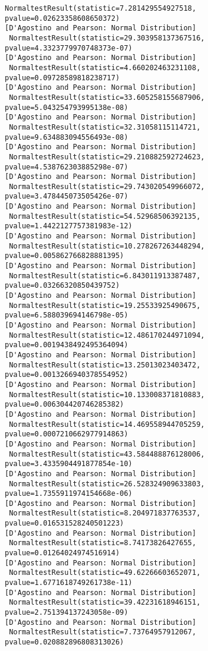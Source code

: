 \documentclass[11pt]{article}
\begin{document}
\begin{Verbatim}[commandchars=\\\{\}]
 NormaltestResult(statistic=7.281429554927518, pvalue=0.02623358608650372)
[D'Agostino and Pearson: Normal Distribution]
 NormaltestResult(statistic=29.303958137367516, pvalue=4.3323779970748373e-07)
[D'Agostino and Pearson: Normal Distribution]
 NormaltestResult(statistic=4.660202463231108, pvalue=0.09728589818238717)
[D'Agostino and Pearson: Normal Distribution]
 NormaltestResult(statistic=33.605258155687906, pvalue=5.043254793995138e-08)
[D'Agostino and Pearson: Normal Distribution]
 NormaltestResult(statistic=32.31058115114721, pvalue=9.634883094556493e-08)
[D'Agostino and Pearson: Normal Distribution]
 NormaltestResult(statistic=29.210882592724623, pvalue=4.538762303885298e-07)
[D'Agostino and Pearson: Normal Distribution]
 NormaltestResult(statistic=29.743020549966072, pvalue=3.478445073505426e-07)
[D'Agostino and Pearson: Normal Distribution]
 NormaltestResult(statistic=54.52968506392135, pvalue=1.4422127757381983e-12)
[D'Agostino and Pearson: Normal Distribution]
 NormaltestResult(statistic=10.278267263448294, pvalue=0.005862766828881395)
[D'Agostino and Pearson: Normal Distribution]
 NormaltestResult(statistic=6.843011913387487, pvalue=0.03266320850439752)
[D'Agostino and Pearson: Normal Distribution]
 NormaltestResult(statistic=19.25533925490675, pvalue=6.588039694146798e-05)
[D'Agostino and Pearson: Normal Distribution]
 NormaltestResult(statistic=12.486170244971094, pvalue=0.0019438492495364094)
[D'Agostino and Pearson: Normal Distribution]
 NormaltestResult(statistic=13.25013023403472, pvalue=0.0013266940378554952)
[D'Agostino and Pearson: Normal Distribution]
 NormaltestResult(statistic=10.133008371810883, pvalue=0.006304420746285382)
[D'Agostino and Pearson: Normal Distribution]
 NormaltestResult(statistic=14.469558944705259, pvalue=0.0007210662977914863)
[D'Agostino and Pearson: Normal Distribution]
 NormaltestResult(statistic=43.584488876128006, pvalue=3.4335904491877854e-10)
[D'Agostino and Pearson: Normal Distribution]
 NormaltestResult(statistic=26.528324909633803, pvalue=1.7355911974154668e-06)
[D'Agostino and Pearson: Normal Distribution]
 NormaltestResult(statistic=8.204971837763537, pvalue=0.016531528240501223)
[D'Agostino and Pearson: Normal Distribution]
 NormaltestResult(statistic=8.74173826427655, pvalue=0.01264024974516914)
[D'Agostino and Pearson: Normal Distribution]
 NormaltestResult(statistic=49.62266603652071, pvalue=1.6771618749261738e-11)
[D'Agostino and Pearson: Normal Distribution]
 NormaltestResult(statistic=39.42231618946151, pvalue=2.751394137243058e-09)
[D'Agostino and Pearson: Normal Distribution]
 NormaltestResult(statistic=7.73764957912067, pvalue=0.020882896808313026)

\end{Verbatim}
\end{document}
